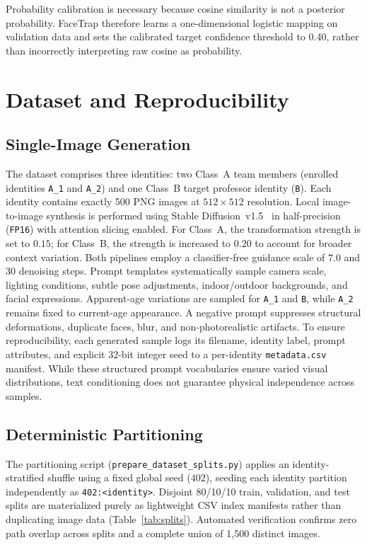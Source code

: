 \documentclass{article}
\begin{document}
Probability calibration is necessary because cosine similarity is not a posterior probability. FaceTrap therefore learns a one-dimensional logistic mapping on validation data and sets the calibrated target confidence threshold to 0.40, rather than incorrectly interpreting raw cosine as probability.

\section{Dataset and Reproducibility}

\subsection{Single-Image Generation}
The dataset comprises three identities: two Class~A team members (enrolled identities \texttt{A\_1} and \texttt{A\_2}) and one Class~B target professor identity (\texttt{B}). Each identity contains exactly 500 PNG images at $512\times512$ resolution. Local image-to-image synthesis is performed using Stable Diffusion~v1.5~\citep{rombach2022ldm} in half-precision (\texttt{FP16}) with attention slicing enabled. 
For Class~A, the transformation strength is set to $0.15$; for Class~B, the strength is increased to $0.20$ to account for broader context variation. Both pipelines employ a classifier-free guidance scale of $7.0$ and 30 denoising steps. Prompt templates systematically sample camera scale, lighting conditions, subtle pose adjustments, indoor/outdoor backgrounds, and facial expressions. Apparent-age variations are sampled for \texttt{A\_1} and \texttt{B}, while \texttt{A\_2} remains fixed to current-age appearance. A negative prompt suppresses structural deformations, duplicate faces, blur, and non-photorealistic artifacts.
To ensure reproducibility, each generated sample logs its filename, identity label, prompt attributes, and explicit 32-bit integer seed to a per-identity \texttt{metadata.csv} manifest. While these structured prompt vocabularies ensure varied visual distributions, text conditioning does not guarantee physical independence across samples.
\subsection{Deterministic Partitioning}
The partitioning script (\texttt{prepare\_dataset\_splits.py}) applies an identity-stratified shuffle using a fixed global seed ($402$), seeding each identity partition independently as \texttt{402:<identity>}. Disjoint 80/10/10 train, validation, and test splits are materialized purely as lightweight CSV index manifests rather than duplicating image data (Table~\ref{tab:splits}). Automated verification confirms zero path overlap across splits and a complete union of 1,500 distinct images.
\end{document}
